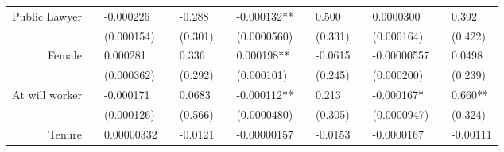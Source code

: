 \begin{tabular}{rrrrrrrrrrrrr}
Public Lawyer & \multicolumn{1}{l}{} & \multicolumn{1}{l}{-0.000226} & \multicolumn{1}{l}{} & \multicolumn{1}{l}{-0.288} & \multicolumn{1}{l}{} & \multicolumn{1}{l}{-0.000132**} & \multicolumn{1}{l}{} & \multicolumn{1}{l}{0.500} & \multicolumn{1}{l}{} & \multicolumn{1}{l}{0.0000300} & \multicolumn{1}{l}{} & \multicolumn{1}{l}{0.392} \\
      & \multicolumn{1}{l}{} & \multicolumn{1}{l}{(0.000154)} & \multicolumn{1}{l}{} & \multicolumn{1}{l}{(0.301)} & \multicolumn{1}{l}{} & \multicolumn{1}{l}{(0.0000560)} & \multicolumn{1}{l}{} & \multicolumn{1}{l}{(0.331)} & \multicolumn{1}{l}{} & \multicolumn{1}{l}{(0.000164)} & \multicolumn{1}{l}{} & \multicolumn{1}{l}{(0.422)} \\
Female & \multicolumn{1}{l}{} & \multicolumn{1}{l}{0.000281} & \multicolumn{1}{l}{} & \multicolumn{1}{l}{0.336} & \multicolumn{1}{l}{} & \multicolumn{1}{l}{0.000198**} & \multicolumn{1}{l}{} & \multicolumn{1}{l}{-0.0615} & \multicolumn{1}{l}{} & \multicolumn{1}{l}{-0.00000557} & \multicolumn{1}{l}{} & \multicolumn{1}{l}{0.0498} \\
      & \multicolumn{1}{l}{} & \multicolumn{1}{l}{(0.000362)} & \multicolumn{1}{l}{} & \multicolumn{1}{l}{(0.292)} & \multicolumn{1}{l}{} & \multicolumn{1}{l}{(0.000101)} & \multicolumn{1}{l}{} & \multicolumn{1}{l}{(0.245)} & \multicolumn{1}{l}{} & \multicolumn{1}{l}{(0.000200)} & \multicolumn{1}{l}{} & \multicolumn{1}{l}{(0.239)} \\
At will worker & \multicolumn{1}{l}{} & \multicolumn{1}{l}{-0.000171} & \multicolumn{1}{l}{} & \multicolumn{1}{l}{0.0683} & \multicolumn{1}{l}{} & \multicolumn{1}{l}{-0.000112**} & \multicolumn{1}{l}{} & \multicolumn{1}{l}{0.213} & \multicolumn{1}{l}{} & \multicolumn{1}{l}{-0.000167*} & \multicolumn{1}{l}{} & \multicolumn{1}{l}{0.660**} \\
      & \multicolumn{1}{l}{} & \multicolumn{1}{l}{(0.000126)} & \multicolumn{1}{l}{} & \multicolumn{1}{l}{(0.566)} & \multicolumn{1}{l}{} & \multicolumn{1}{l}{(0.0000480)} & \multicolumn{1}{l}{} & \multicolumn{1}{l}{(0.305)} & \multicolumn{1}{l}{} & \multicolumn{1}{l}{(0.0000947)} & \multicolumn{1}{l}{} & \multicolumn{1}{l}{(0.324)} \\
Tenure & \multicolumn{1}{l}{} & \multicolumn{1}{l}{0.00000332} & \multicolumn{1}{l}{} & \multicolumn{1}{l}{-0.0121} & \multicolumn{1}{l}{} & \multicolumn{1}{l}{-0.00000157} & \multicolumn{1}{l}{} & \multicolumn{1}{l}{-0.0153} & \multicolumn{1}{l}{} & \multicolumn{1}{l}{-0.0000167} & \multicolumn{1}{l}{} & \multicolumn{1}{l}{-0.00111} \\

\end{tabular}
